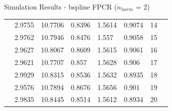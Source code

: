 \documentclass{beamer}
\begin{document}
\begin{frame}{Simulation Results - bspline FPCR ($n_{harm}$ = 2)}
\begin{table}
{\begin{tabular}{llllllll}
 & 2.9755                       & 10.7706                       & 0.8396                        & 1.5614                        & 0.9074           & 14               &  \\
 & 2.9762                       & 10.7946                       & 0.8476                        & 1.557                         & 0.9058           & 15               &  \\
 & 2.9627                       & 10.8067                       & 0.8609                        & 1.5615                        & 0.9061           & 16               &  \\
 & 2.9621                       & 10.7707                       & 0.857                         & 1.5628                        & 0.906            & 17               &  \\
 & 2.9929                       & 10.8315                       & 0.8536                        & 1.5632                        & 0.8935           & 18               &  \\
 & 2.9576                       & 10.7894                       & 0.8676                        & 1.5656                        & 0.901            & 19               &  \\
 & 2.9835                       & 10.8445                       & 0.8514                        & 1.5612                        & 0.8934           & 20               & 
\end{tabular}%
}
\end{table}
	\end{frame}
	
	
	
\end{document}
